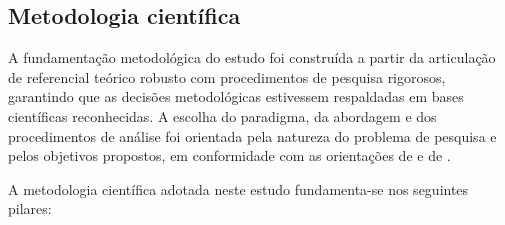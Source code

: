 \subsection{Metodologia científica}
\label{subsec:metodologia_cientifica}

A fundamentação metodológica do estudo foi construída a partir da articulação de referencial teórico robusto com procedimentos de pesquisa rigorosos, garantindo que as decisões metodológicas estivessem respaldadas em bases científicas reconhecidas. A escolha do paradigma, da abordagem e dos procedimentos de análise foi orientada pela natureza do problema de pesquisa e pelos objetivos propostos, em conformidade com as orientações de \cite{CRESWELL2018} e de \cite{BARDIN2016}.

A metodologia científica adotada neste estudo fundamenta-se nos seguintes pilares:

